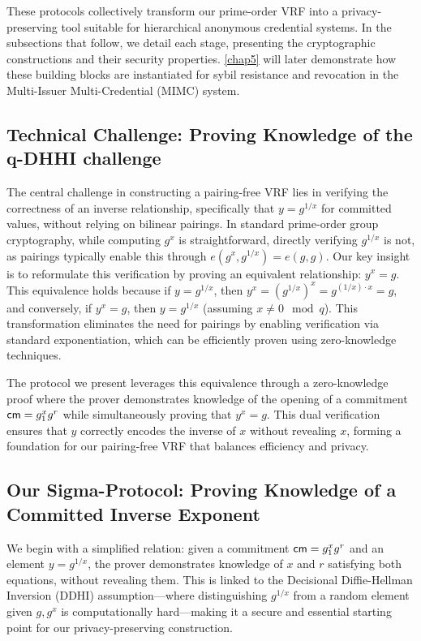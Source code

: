 These protocols collectively transform our prime-order VRF into a privacy-preserving tool suitable for hierarchical anonymous credential systems. In the subsections that follow, we detail each stage, presenting the cryptographic constructions and their security properties. \ref{chap5} will later demonstrate how these building blocks are instantiated for sybil resistance and revocation in the Multi-Issuer Multi-Credential (MIMC) system.







\subsection{Technical Challenge: Proving Knowledge of the q-DHHI challenge}

The central challenge in constructing a pairing-free VRF lies in verifying the correctness of an inverse relationship, specifically that $y = g^{1/x}$ for committed values, without relying on bilinear pairings. In standard prime-order group cryptography, while computing $g^x$ is straightforward, directly verifying $g^{1/x}$ is not, as pairings typically enable this through $e(g^x, g^{1/x}) = e(g,g)$. Our key insight is to reformulate this verification by proving an equivalent relationship: $y^x = g$. This equivalence holds because if $y = g^{1/x}$, then $y^x = (g^{1/x})^x = g^{(1/x) \cdot x} = g$, and conversely, if $y^x = g$, then $y = g^{1/x}$ (assuming $x \neq 0 \mod q$). This transformation eliminates the need for pairings by enabling verification via standard exponentiation, which can be efficiently proven using zero-knowledge techniques.

The protocol we present leverages this equivalence through a zero-knowledge proof where the prover demonstrates knowledge of the opening of a commitment $\mathsf{cm} = g_1^x g^r$ while simultaneously proving that $y^x = g$. This dual verification ensures that $y$ correctly encodes the inverse of $x$ without revealing $x$, forming a foundation for our pairing-free VRF that balances efficiency and privacy.

\subsection{Our Sigma-Protocol: Proving Knowledge of a Committed Inverse Exponent}

We begin with a simplified relation: given a commitment $\mathsf{cm} = g_1^x g^r$ and an element $y = g^{1/x}$, the prover demonstrates knowledge of $x$ and $r$ satisfying both equations, without revealing them. This is linked to the Decisional Diffie-Hellman Inversion (DDHI) assumption—where distinguishing $g^{1/x}$ from a random element given $g, g^x$ is computationally hard—making it a secure and essential starting point for our privacy-preserving construction.


